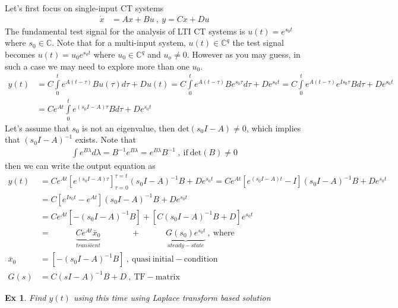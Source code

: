 \documentclass[twoside]{article}
\newtheorem{exmp}[theorem]{Ex}
\begin{document}
Let's first focus on single-input CT systems 
%
\begin{align*}
       \dot{x} &= A x + B u \ , \ y = C x + D u
\end{align*}
%
The fundamental test signal for the analysis of LTI CT systems is $u(t) = e^{s_0 t}$ where $s_0 \in \mathbb{C}$. Note that for a multi-input system, $u(t) \in \mathbb{C}^q$ the test signal becomes $u(t) = u_0 e^{s_0 t}$ where $u_0 \in \mathbb{C}^q$ and $u_o \neq 0$. However as you may guess, in such a case we may need to explore more than one $u_0$.
%
\begin{align*}
  y(t) &= C \int\limits_{0}^{t} e^{A ( t - \tau ) } B u(\tau) d \tau + D u(t) = C \int\limits_{0}^{t} e^{A ( t - \tau ) } B e^{s_0 \tau} d \tau + D e^{s_0 t} = 
  C \int\limits_{0}^{t} e^{A ( t - \tau ) } e^{I s_0 \tau} B d \tau + D e^{s_0 t}
  \\[1ex]
  &=   C e^{A t} \int\limits_{0}^{t} e^{(s_0 I - A)  \tau} B d \tau + D e^{s_0 t}
\end{align*}
%
Let's assume that $s_0$ is not an eigenvalue, then $\mathrm{det}(s_0 I - A) \neq 0$, which implies that $(s_0 I - A)^{-1}$ exists. Note that
%
\begin{align*}
\int e^{B \lambda} d \lambda = B^{-1} e^{B \lambda} = e^{B \lambda} B^{-1} \ , \ \mathrm{if} \ \mathrm{det}(B) \neq 0
\end{align*}
%
then we can write the output equation as
\begin{align*}
  y(t) &= C e^{A t} \left[ e^{(s_0 I - A)  \tau} \right]_{\tau = 0}^{\tau = t} (s_0 I - A)^{-1} B + D e^{s_0 t}
  = C e^{A t} \left[ e^{(s_0 I - A)  t} - I \right] (s_0 I - A)^{-1} B + D e^{s_0 t}
  \\[1ex]
  &= C \left[ e^{I s_0 t} - e^{A t} \right] (s_0 I - A)^{-1} B + D e^{s_0 t} 
  \\[1ex]
  &=  C e^{A t} \left[ - (s_0 I - A)^{-1} B \right] +
  \left[ C (s_0 I - A)^{-1} B + D \right] e^{s_0 t}
  \\[1ex]
  &= \quad \quad  \quad  \underbrace{C e^{A t} \bar{x}_0}_{transient}  \quad \quad \quad \ \ \, +
   \quad \quad \quad \underbrace{G(s_0) e^{s_0 t}}_{steady-state} \ , \ \mathrm{where}
   \\[1ex]
   \bar{x}_0 &=  \left[ - (s_0 I - A)^{-1} B \right] \ , \ \mathrm{quasi} \ \mathrm{initial-condition}
   \\[1ex]
   G(s) &= C (s I - A)^{-1} B + D \ , \ \mathrm{TF-matrix} 
\end{align*}

\begin{exmp}
 Find $y(t)$ using this time using Laplace transform based solution 
\end{exmp}
\end{document}
